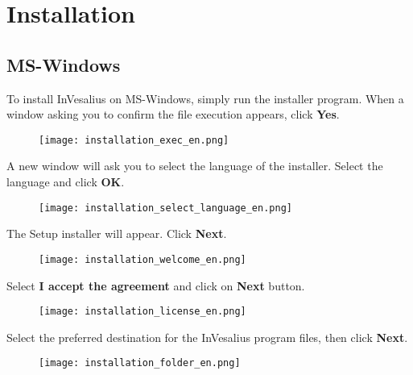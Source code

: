 \chapter{Installation}

\section{MS-Windows}


To install InVesalius on MS-Windows, simply run the installer program. When a window asking you to confirm the file execution appears, click \textbf{Yes}.

\begin{figure}[!htb]
\centering
\texttt{[image: installation\_exec\_en.png]}
\end{figure}

\newpage

A new window will ask you to select the language of the installer. Select the language and click \textbf{OK}.

\begin{figure}[!htb]
\centering
\texttt{[image: installation\_select\_language\_en.png]}
\end{figure}
 
\hspace{.2cm}

The Setup installer will appear. Click \textbf{Next}.

\begin{figure}[!htb]
\centering
\texttt{[image: installation\_welcome\_en.png]}
\end{figure}

\newpage

Select \textbf{I accept the agreement} and click on \textbf{Next} button.

\begin{figure}[!htb] 
\centering
\texttt{[image: installation\_license\_en.png]}
\end{figure}

\hspace{.2cm}

Select the preferred destination for the InVesalius program files, then click \textbf{Next}.

\begin{figure}[!htb]  
\centering
\texttt{[image: installation\_folder\_en.png]}
\end{figure}

\newpage

